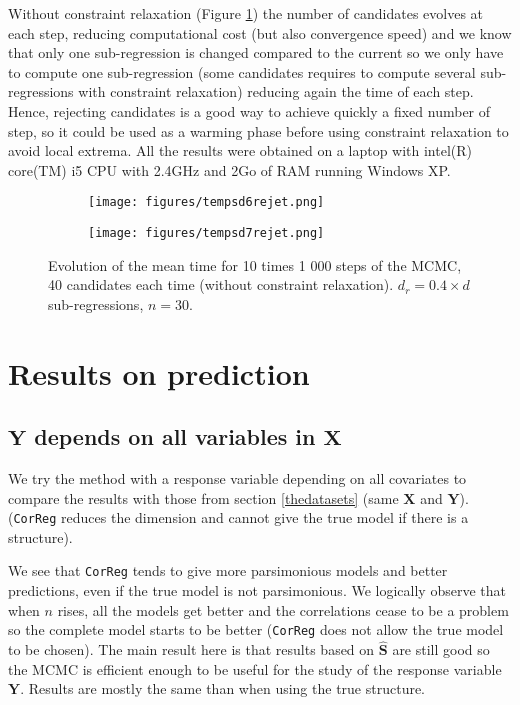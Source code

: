 \documentclass[12pt,a4paper]{report}
\begin{document}
 Without constraint relaxation (Figure \ref{tempsdrejet}) the number of candidates evolves at each step, reducing computational cost (but also convergence speed) and we know that only one sub-regression is changed compared to the current so we only have to compute one sub-regression (some candidates requires to compute several sub-regressions with constraint relaxation) reducing again the time of each step. Hence, rejecting candidates is a good way to achieve quickly a fixed number of step, so it could be used as a warming phase before using constraint relaxation to avoid local extrema. All the results were obtained on a laptop with intel(R) core(TM) i5 CPU with 2.4GHz and 2Go of RAM running Windows XP.
\begin{figure}[h]
\centering
	\begin{subfigure}
	\centering
		\texttt{[image: figures/tempsd6rejet.png]} 
	\end{subfigure}
	\begin{subfigure}
	\centering
		\texttt{[image: figures/tempsd7rejet.png]} 
	\end{subfigure}
	\caption{Evolution of the mean time for 10 times 1 000 steps of the MCMC, 40 candidates each time (without constraint relaxation). $d_r=0.4\times d$ sub-regressions, $n=30$.}\label{tempsdrejet}
\end{figure} 
  
\clearpage
\section{Results on prediction}\label{compY}
\subsection{$\boldsymbol{Y}$ depends on all variables in $\boldsymbol{X}$}	 \label{explsimtout}	
We try the method with a response variable depending on all covariates to compare the results with those from section \ref{thedatasets} (same $\boldsymbol{X}$ and $\boldsymbol{Y}$). ({\tt CorReg} reduces the dimension and cannot give the true model if there is a structure). %

 We see that {\tt CorReg} tends to give more parsimonious models and better predictions, even if the true model is not parsimonious. We logically observe that when $n$ rises, all the models get better and the correlations cease to be a problem so the complete model starts to be better ({\tt CorReg} does not allow the true model to be chosen). The main result here is that results based on $\hat{\boldsymbol{S}}$ are still good so the MCMC is efficient enough to be useful for the study of the response variable $\boldsymbol{Y}$. Results are mostly the same than when using the true structure.\\
 
\end{document}
